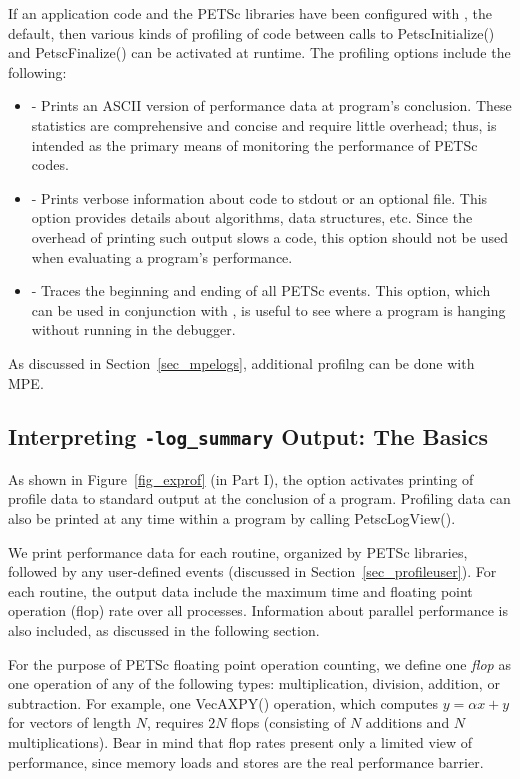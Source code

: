 If an application code and the PETSc libraries have been configured with
, the default,
then various kinds of profiling of code between calls to PetscInitialize() and PetscFinalize() can be
activated at runtime.  The profiling options include the following:
 
\begin{itemize}
\item {} - Prints an ASCII version of performance data
     at program's conclusion. These statistics are comprehensive and concise
     and require little overhead; thus,  is intended as
     the primary means of monitoring the performance of PETSc codes.
\item {} - Prints verbose information about code to
     stdout or an optional file. This option provides details about algorithms,
     data structures, etc. Since the overhead of printing such output slows a
     code, this option should not be used when evaluating a program's performance.
\item {} - Traces the beginning and ending of all
     PETSc events.  This option, which can be used in conjunction with
     , is useful to see where a program is hanging
     without running in the debugger.
\end{itemize}
 As discussed in Section~\ref{sec_mpelogs},
additional profilng can be done with MPE.

\subsection{Interpreting {\tt -log\_summary} Output: The Basics}
\label{sec_ploginfo}

As shown in Figure~\ref{fig_exprof} (in Part I), the option
  activates printing of profile
data to standard output at the conclusion of a program.  Profiling
data can also be printed at any time within a program by calling PetscLogView().

We print performance data for each routine, organized by PETSc
libraries, followed by any user-defined events (discussed in
Section~\ref{sec_profileuser}).  For each routine, the output data
include the maximum time and floating point operation (flop) rate over
all processes.  Information about parallel performance is also
included, as discussed in the following section.

For the purpose of PETSc floating point operation counting, we define
one {\em flop} as one operation of any of the following types:
multiplication, division, addition, or subtraction.  For example, one
VecAXPY() operation, which computes $y = \alpha x + y$ for
vectors of length $N$, requires $2N$ flops (consisting of $N$
additions and $N$ multiplications).  Bear in mind that flop rates
present only a limited view of performance, since memory loads and stores are
the real performance barrier.

